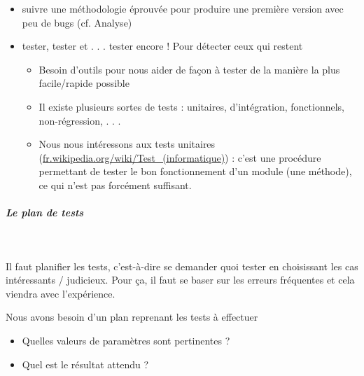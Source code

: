 \documentclass[11pt,a4paper]{article}
\begin{document}
					\begin{itemize}
				
			\item 
              suivre une m\'ethodologie \'eprouv\'ee pour produire une premi\`ere version avec peu de bugs
              (cf. Analyse)
            
			\item 
              tester, tester et . . . tester encore ! Pour d\'etecter ceux qui restent
              
					\begin{itemize}
				
			\item Besoin d'outils pour nous aider de fa\c con \`a tester de la mani\`ere la plus facile/rapide possible
			\item Il existe plusieurs sortes de tests : unitaires, d'int\'egration, fonctionnels, non-r\'egression, . . .
			\item Nous nous int\'eressons aux tests unitaires (\url{fr.wikipedia.org/wiki/Test\_(informatique)}) : 
                c'est une proc\'edure permettant de tester le bon fonctionnement d'un module (une m\'ethode), ce qui n'est pas forc\'ement suffisant.
					\end{itemize}
				
					\end{itemize}
				
            \par
        
			
		\subparagraph{Le plan de tests} 
		
					\textcolor{white}{.} \par
				
          Il faut planifier les tests, c'est-\`a-dire se demander quoi tester en choisissant les cas int\'eressants / judicieux.
          Pour \c ca, il faut se baser sur les erreurs fr\'equentes et cela viendra avec l'exp\'erience.
        
            \par
        
          Nous avons besoin d'un plan reprenant les tests \`a effectuer
          
					\begin{itemize}
				
			\item Quelles valeurs de param\`etres sont pertinentes ?
			\item Quel est le r\'esultat attendu ?
					\end{itemize}
				
\end{document}
